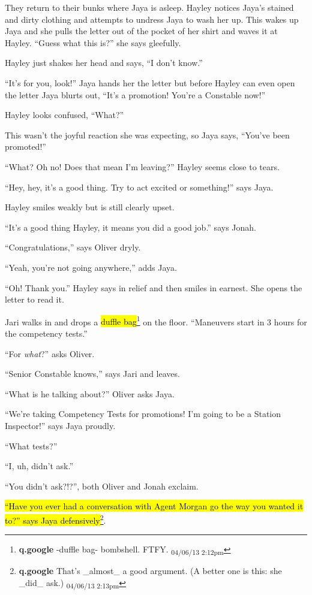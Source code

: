 They return to their bunks where Jaya is asleep.  Hayley notices Jaya's stained and dirty clothing and attempts to undress Jaya to wash her up.  This wakes up Jaya and she pulls the letter out of the pocket of her shirt and waves it at Hayley. ``Guess what this is?'' she says gleefully.

Hayley just shakes her head and says, ``I don't know.''

``It's for you, look!'' Jaya hands her the letter but before Hayley can even open the letter Jaya blurts out, ``It's a promotion!  You're a Constable now!''

Hayley looks confused, ``What?''

This wasn't the joyful reaction she was expecting, so Jaya says, ``You've been promoted!''

``What?  Oh no!  Does that mean I'm leaving?'' Hayley seems close to tears.

``Hey, hey, it's a good thing.  Try to act excited or something!'' says Jaya.

Hayley smiles weakly but is still clearly upset.

``It's a good thing Hayley, it means you did a good job.'' says Jonah.

``Congratulations,'' says Oliver dryly.

``Yeah, you're not going anywhere,'' adds Jaya.

``Oh!  Thank you.'' Hayley says in relief and then smiles in earnest.  She opens the letter to read it.



Jari walks in and drops a \hl{duffle bag}\footnote{\textbf{q.google }-duffle bag- bombshell.
FTFY. \textsubscript{04/06/13 2:12pm}} on the floor.  ``Maneuvers start in 3 hours for the competency tests.''

``For \textit{what}?'' asks Oliver.

``Senior Constable knows,'' says Jari and leaves.

``What is he talking about?''  Oliver asks Jaya.

``We're taking Competency Tests for promotions!  I'm going to be a Station Inspector!'' says Jaya proudly.

``What tests?''

``I, uh, didn't ask.''

``You didn't ask?!?'', both Oliver and Jonah exclaim.

\hl{``Have you ever had a conversation with Agent Morgan go the way you wanted it to?'' says Jaya defensively}\footnote{\textbf{q.google }That's \_almost\_ a good argument.  (A better one is this: she \_did\_ ask.) \textsubscript{04/06/13 2:13pm}}.

